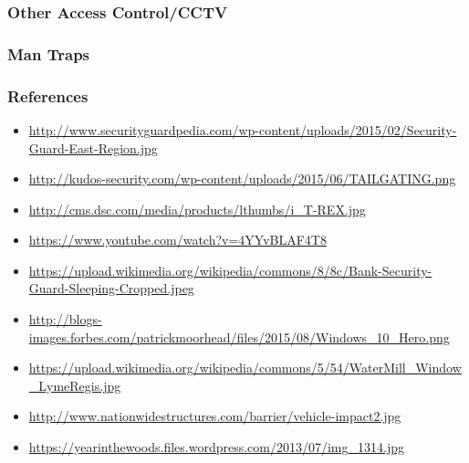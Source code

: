 \documentclass[]{beamer}
\begin{document}
\begin{frame}
  \frametitle{Other Access Control/CCTV}
\end{frame}

\begin{frame}
  \frametitle{Man Traps}
\end{frame}

\begin{frame}
  \frametitle{References}
  \begin{itemize}
    \item \url{http://www.securityguardpedia.com/wp-content/uploads/2015/02/Security-Guard-East-Region.jpg}
    \item \url{http://kudos-security.com/wp-content/uploads/2015/06/TAILGATING.png}
    \item \url{http://cms.dsc.com/media/products/lthumbs/i_T-REX.jpg}
    \item \url{https://www.youtube.com/watch?v=4YYvBLAF4T8}
    \item \url{https://upload.wikimedia.org/wikipedia/commons/8/8c/Bank-Security-Guard-Sleeping-Cropped.jpeg}
    \item \url{http://blogs-images.forbes.com/patrickmoorhead/files/2015/08/Windows_10_Hero.png}
    \item \url{https://upload.wikimedia.org/wikipedia/commons/5/54/WaterMill_Window_LymeRegis.jpg}
    \item \url{http://www.nationwidestructures.com/barrier/vehicle-impact2.jpg}
    \item \url{https://yearinthewoods.files.wordpress.com/2013/07/img_1314.jpg}
  \end{itemize}

\end{frame}
\end{document}
